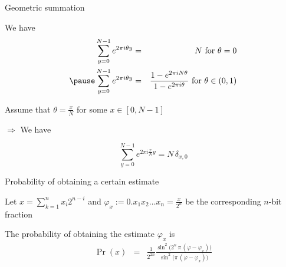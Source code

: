 


\begin{frame}{Geometric summation}

\begin{lemma}
We have
\begin{eqnarray*}
\sum_{y=0}^{N-1} e^{2\pi i \theta y} & = & N \mbox{~for $\theta=0$} \\ \pause
\sum_{y=0}^{N-1} e^{2\pi i \theta y} & = & \frac{1-e^{2\pi i N \theta}}{1-e^{2\pi i \theta}} \mbox{~for $\theta\in (0,1)$}
\end{eqnarray*}
\end{lemma}

\bigskip
Assume that $\theta=\frac{x}{N}$ for some $x\in[0,N-1]$

\pause

\bigskip
$\Rightarrow$ We have

\[
\sum_{y=0}^{N-1} e^{2\pi i \frac{x}{N} y} = N \, \delta_{x,0}
\]

\bigskip

\end{frame}




\begin{frame}{Probability of obtaining a certain estimate}

\begin{lemma}
Let $x=\sum_{k=1}^n x_i 2^{n-i}$ and $\varphi_x := 0.x_1 x_2 \ldots x_n = \frac{x}{2^n}$ be the corresponding $n$-bit fraction \pause

\bigskip
The probability of obtaining the estimate $\varphi_x$ is 
\bigskip
\begin{eqnarray*}
	\Pr(x) 
	& = &
	\frac{1}{2^{2n}}
	\frac{\sin^2 \big(2^n \, \pi \, (\varphi - \varphi_x)\big)}{\sin^2\big( \pi\, (\varphi - \varphi_x)\big)}
\end{eqnarray*}
\end{lemma}
\end{frame}


